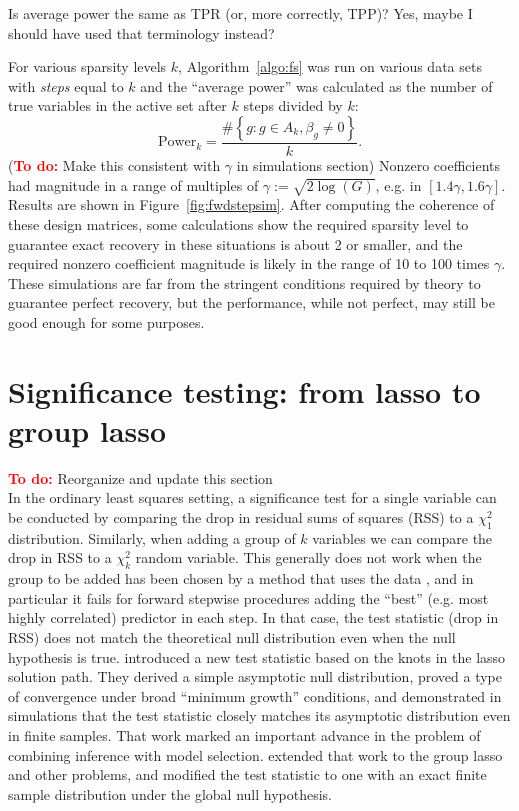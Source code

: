 \documentclass{imsart}
\newcommand{\todo}{\textcolor{red}{\textbf{To do: }}}
\newcommand{\jonathan}[1]{{\color{blue}  #1}}
\newcommand{\josh}[1]{{\color{green} #1}}
\begin{document}
\jonathan{Is average power the same as TPR (or, more correctly, TPP)?}
\josh{Yes, maybe I should have used that terminology instead?}


For various sparsity levels $k$, Algorithm~\ref{algo:fs} was run on
various data sets with \textit{steps} equal to $k$ and the ``average
power'' was calculated as the number of true variables in the active
set after $k$ steps divided by $k$:
$$
\text{Power}_k = \frac{\# \left\{g: g \in A_k, \beta_g \neq 0\right\}}{k}.
$$ (\todo Make this consistent with
$\gamma$ in simulations section)
Nonzero coefficients had magnitude
in a range of multiples of $\gamma := \sqrt{2\log(G)}$, e.g. in $[1.4
\gamma, 1.6 \gamma]$. Results are shown in
Figure~\ref{fig:fwdstepsim}. After computing the
coherence of these design matrices, some calculations show the required
sparsity level to guarantee exact recovery in these situations is
about 2 or smaller, and the required nonzero coefficient magnitude is
likely in the range of 10 to 100 times $\gamma$. These simulations are far
from the stringent conditions required by theory to guarantee perfect
recovery, but the performance, while not perfect, may still be good
enough for some purposes.




\section{Significance testing: from lasso to group lasso}
\label{sec:testing}

\todo Reorganize and update this section \\

In the ordinary least squares setting, a significance test for a
single variable can be conducted by comparing the drop in residual
sums of squares (RSS) to a $\chi^2_1$ distribution. Similarly, when
adding a group of $k$ variables we can compare the drop in RSS to a
$\chi^2_k$ random variable. This generally does not work when the
group to be added has been chosen by a method that uses the data \cite{olshen:flevel},
and in particular it fails for forward stepwise procedures adding
the ``best'' (e.g. most highly correlated) predictor in each step. In
that case, the test statistic (drop in RSS) does not match the
theoretical null distribution even when the null hypothesis is
true. \cite{significance:lasso} introduced a new test statistic based
on the knots in the lasso solution path. They derived a simple
asymptotic null distribution, proved a type of convergence under broad
``minimum growth'' conditions, and demonstrated in simulations that
the test statistic closely matches its asymptotic distribution even in
finite samples.  That work marked an important advance in the problem
of combining inference with model selection.  \cite{tests:adaptive}
extended that work to the group lasso \citep{grouplasso} and other
problems, and modified the test statistic to one with an exact finite
sample distribution under the global null hypothesis.
\end{document}
